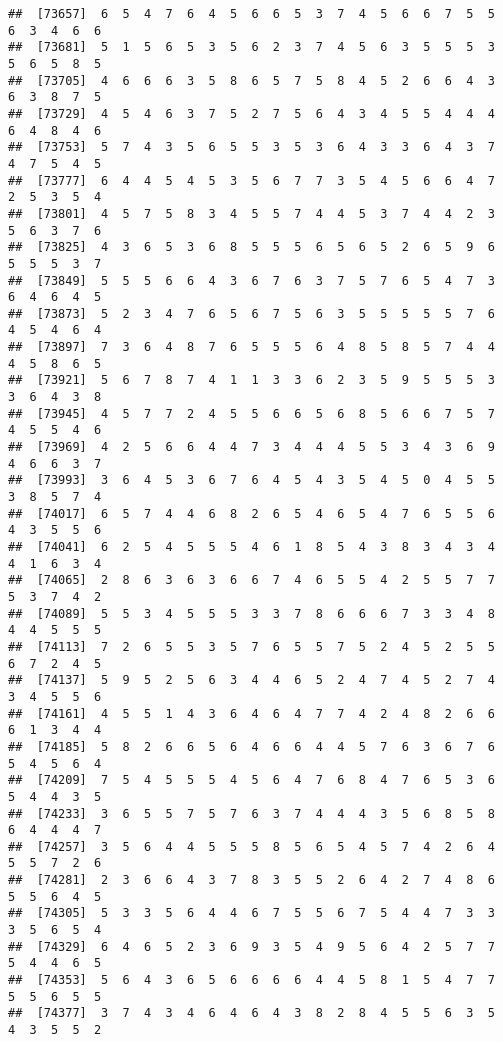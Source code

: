 \documentclass[
]{book}
\begin{document}
\begin{verbatim}
##  [73657]  6  5  4  7  6  4  5  6  6  5  3  7  4  5  6  6  7  5  5  6  3  4  6  6
##  [73681]  5  1  5  6  5  3  5  6  2  3  7  4  5  6  3  5  5  5  3  5  6  5  8  5
##  [73705]  4  6  6  6  3  5  8  6  5  7  5  8  4  5  2  6  6  4  3  6  3  8  7  5
##  [73729]  4  5  4  6  3  7  5  2  7  5  6  4  3  4  5  5  4  4  4  6  4  8  4  6
##  [73753]  5  7  4  3  5  6  5  5  3  5  3  6  4  3  3  6  4  3  7  4  7  5  4  5
##  [73777]  6  4  4  5  4  5  3  5  6  7  7  3  5  4  5  6  6  4  7  2  5  3  5  4
##  [73801]  4  5  7  5  8  3  4  5  5  7  4  4  5  3  7  4  4  2  3  5  6  3  7  6
##  [73825]  4  3  6  5  3  6  8  5  5  5  6  5  6  5  2  6  5  9  6  5  5  5  3  7
##  [73849]  5  5  5  6  6  4  3  6  7  6  3  7  5  7  6  5  4  7  3  6  4  6  4  5
##  [73873]  5  2  3  4  7  6  5  6  7  5  6  3  5  5  5  5  5  7  6  4  5  4  6  4
##  [73897]  7  3  6  4  8  7  6  5  5  5  6  4  8  5  8  5  7  4  4  4  5  8  6  5
##  [73921]  5  6  7  8  7  4  1  1  3  3  6  2  3  5  9  5  5  5  3  3  6  4  3  8
##  [73945]  4  5  7  7  2  4  5  5  6  6  5  6  8  5  6  6  7  5  7  4  5  5  4  6
##  [73969]  4  2  5  6  6  4  4  7  3  4  4  4  5  5  3  4  3  6  9  4  6  6  3  7
##  [73993]  3  6  4  5  3  6  7  6  4  5  4  3  5  4  5  0  4  5  5  3  8  5  7  4
##  [74017]  6  5  7  4  4  6  8  2  6  5  4  6  5  4  7  6  5  5  6  4  3  5  5  6
##  [74041]  6  2  5  4  5  5  5  4  6  1  8  5  4  3  8  3  4  3  4  4  1  6  3  4
##  [74065]  2  8  6  3  6  3  6  6  7  4  6  5  5  4  2  5  5  7  7  5  3  7  4  2
##  [74089]  5  5  3  4  5  5  5  3  3  7  8  6  6  6  7  3  3  4  8  4  4  5  5  5
##  [74113]  7  2  6  5  5  3  5  7  6  5  5  7  5  2  4  5  2  5  5  6  7  2  4  5
##  [74137]  5  9  5  2  5  6  3  4  4  6  5  2  4  7  4  5  2  7  4  3  4  5  5  6
##  [74161]  4  5  5  1  4  3  6  4  6  4  7  7  4  2  4  8  2  6  6  6  1  3  4  4
##  [74185]  5  8  2  6  6  5  6  4  6  6  4  4  5  7  6  3  6  7  6  5  4  5  6  4
##  [74209]  7  5  4  5  5  5  4  5  6  4  7  6  8  4  7  6  5  3  6  5  4  4  3  5
##  [74233]  3  6  5  5  7  5  7  6  3  7  4  4  4  3  5  6  8  5  8  6  4  4  4  7
##  [74257]  3  5  6  4  4  5  5  5  8  5  6  5  4  5  7  4  2  6  4  5  5  7  2  6
##  [74281]  2  3  6  6  4  3  7  8  3  5  5  2  6  4  2  7  4  8  6  5  5  6  4  5
##  [74305]  5  3  3  5  6  4  4  6  7  5  5  6  7  5  4  4  7  3  3  3  5  6  5  4
##  [74329]  6  4  6  5  2  3  6  9  3  5  4  9  5  6  4  2  5  7  7  5  4  4  6  5
##  [74353]  5  6  4  3  6  5  6  6  6  6  4  4  5  8  1  5  4  7  7  5  5  6  5  5
##  [74377]  3  7  4  3  4  6  4  6  4  3  8  2  8  4  5  5  6  3  5  4  3  5  5  2

\end{verbatim}
\end{document}
